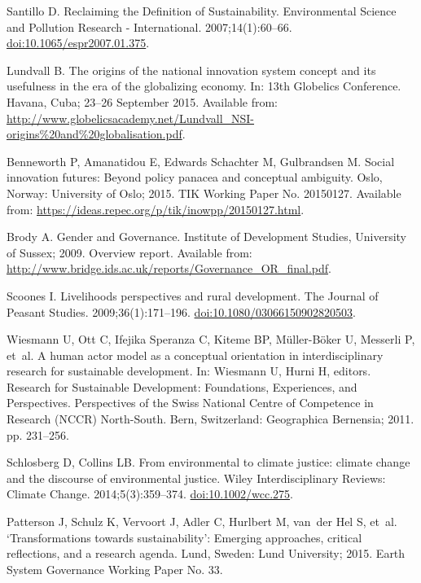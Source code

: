 \documentclass[10pt,a4paper]{article}
\begin{document}
\begin{multicols}{2}
\begin{footnotesize}
\begin{thebibliography}{10}
Santillo D.
\newblock Reclaiming the Definition of Sustainability.
\newblock Environmental Science and Pollution Research - International.
  2007;14(1):60--66.
\newblock
  \href{https://doi.org/10.1065/espr2007.01.375}{doi:10.1065/espr2007.01.375}.

Lundvall B.
\newblock The origins of the national innovation system concept and its
  usefulness in the era of the globalizing economy.
\newblock In: 13th Globelics Conference. Havana, Cuba; 23--26 September 2015.
  Available from:
  \url{http://www.globelicsacademy.net/Lundvall_NSI-origins%20and%20globalisation.pdf}.

Benneworth P, Amanatidou E, {Edwards Schachter} M, Gulbrandsen M.
\newblock Social innovation futures: Beyond policy panacea and conceptual
  ambiguity.
\newblock Oslo, Norway: University of Oslo; 2015. TIK Working Paper No.
  20150127.
\newblock Available from:
  \url{https://ideas.repec.org/p/tik/inowpp/20150127.html}.

Brody A.
\newblock Gender and Governance.
\newblock Institute of Development Studies, University of Sussex; 2009.
  Overview report.
\newblock Available from:
  \url{http://www.bridge.ids.ac.uk/reports/Governance_OR_final.pdf}.

Scoones I.
\newblock Livelihoods perspectives and rural development.
\newblock The Journal of Peasant Studies. 2009;36(1):171--196.
\newblock
  \href{https://doi.org/10.1080/03066150902820503}{doi:10.1080/03066150902820503}.

Wiesmann U, Ott C, {Ifejika Speranza} C, Kiteme BP, Müller-Böker U, Messerli
  P, et~al.
\newblock A human actor model as a conceptual orientation in interdisciplinary
  research for sustainable development.
\newblock In: Wiesmann U, Hurni H, editors. Research for Sustainable
  Development: Foundations, Experiences, and Perspectives. Perspectives of the
  Swiss National Centre of Competence in Research (NCCR) North-South. Bern,
  Switzerland: Geographica Bernensia; 2011. pp. 231--256.

Schlosberg D, Collins LB.
\newblock From environmental to climate justice: climate change and the
  discourse of environmental justice.
\newblock Wiley Interdisciplinary Reviews: Climate Change. 2014;5(3):359--374.
\newblock \href{https://doi.org/10.1002/wcc.275}{doi:10.1002/wcc.275}.

Patterson J, Schulz K, Vervoort J, Adler C, Hurlbert M, van~der Hel S, et~al.
\newblock `Transformations towards sustainability': Emerging approaches,
  critical reflections, and a research agenda.
\newblock Lund, Sweden: Lund University; 2015. Earth System Governance Working
  Paper No. 33.


\end{thebibliography}
\end{footnotesize}
\end{multicols}
\end{document}
